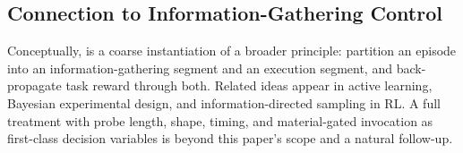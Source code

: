 \subsection{Connection to Information-Gathering Control}

Conceptually, \PTA{} is a coarse instantiation of a broader principle: partition an episode into an information-gathering segment and an execution segment, and back-propagate task reward through both. Related ideas appear in active learning, Bayesian experimental design, and information-directed sampling in RL. A full treatment with probe length, shape, timing, and material-gated invocation as first-class decision variables is beyond this paper's scope and a natural follow-up.
